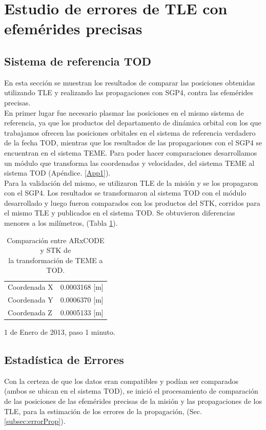 \section{Estudio de errores de TLE con efem\'erides precisas}
\subsection*{Sistema de referencia TOD}
En esta secci\'on se muestran los resultados de comparar las posiciones obtenidas utilizando TLE y realizando las propagaciones con SGP4, contra las efem\'erides precisas.\\ 

En primer lugar fue necesario plasmar las posiciones en el mismo sistema de referencia, ya que los productos del departamento de din\'amica orbital con los que trabajamos ofrecen las posiciones orbitales en el sistema de referencia verdadero de la fecha \ac{TOD}, mientras que los resultados de las propagaciones con el SGP4 se encuentran en el sistema \ac{TEME}. Para poder hacer comparaciones desarrollamos un m\'odulo que transforma las coordenadas y velocidades, del sistema TEME al sistema TOD (Ap\'endice. \ref{App1}).\\

Para la validaci\'on del mismo, se utilizaron TLE de la misi\'on y se los propagaron con el SGP4. Los resultados se transformaron al sistema TOD con el m\'odulo desarrollado y luego fueron comparados con los productos del STK, corridos para el mismo TLE y publicados en el sistema TOD. Se obtuvieron diferencias menores a los mil\'imetros, (Tabla \ref{tab:compprecisas}).\\

\begin{table}[!h]
\caption{Comparaci\'on entre ARxCODE y STK de \\la transformaci\'on de TEME a TOD.}
\begin{tabular}{l|c}
  \hline
  Coordenada  X &  0.0003168 [m]\\
  Coordenada Y &  0.0006370 [m]\\
  Coordenada Z &  0.0005133 [m]\\
  \hline
\end{tabular}
\label{tab:compprecisas}
\begin{flushleft}
\small 1 de Enero de 2013, paso 1 minuto.
\end{flushleft}
\end{table}

\subsection*{Estad\'istica de Errores}
Con la certeza de que los datos eran compatibles y pod\'ian ser comparados (ambos se ubican en el sistema TOD), se inici\'o el procesamiento de comparaci\'on de las posiciones de las efem\'erides precisas de la misi\'on y las propagaciones de los TLE, para la estimaci\'on de los errores de la propagaci\'on, (Sec. \ref{subsec:errorProp}).\\

